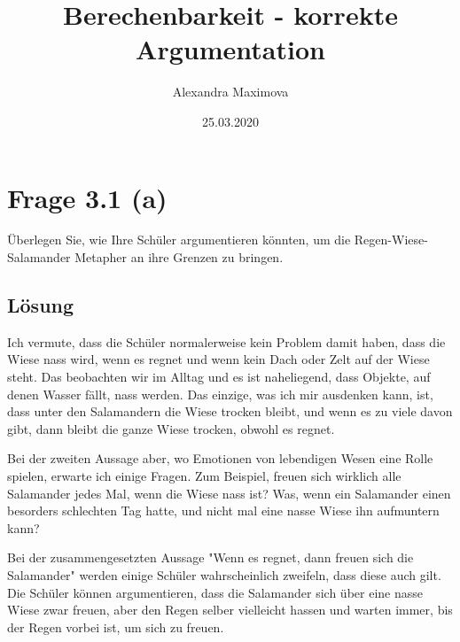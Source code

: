 \documentclass[
	12pt, %
	german, %
]{fphw}
\title{Berechenbarkeit - korrekte Argumentation} %
\author{Alexandra Maximova} %
\date{25.03.2020} %
\institute{ETH Zurich \\ Lehrdiplom Informatik} %
\begin{document}
\maketitle %


\section*{Frage 3.1 (a)}

\begin{problem}
	Überlegen Sie, wie Ihre Schüler argumentieren könnten, um die Regen-Wiese-Salamander Metapher an ihre Grenzen zu bringen.
\end{problem}


\subsection*{Lösung}
Ich vermute, dass die Schüler normalerweise kein Problem damit haben, dass die Wiese nass wird, wenn es regnet und wenn kein Dach oder Zelt auf der Wiese steht. Das beobachten wir im Alltag und es ist naheliegend, dass Objekte, auf denen Wasser fällt, nass werden. Das einzige, was ich mir ausdenken kann, ist, dass unter den Salamandern  die Wiese trocken bleibt, und wenn es zu viele davon gibt, dann bleibt die ganze Wiese trocken, obwohl es regnet.

Bei der zweiten Aussage aber, wo Emotionen von lebendigen Wesen eine Rolle spielen, erwarte ich einige Fragen. Zum Beispiel, freuen sich wirklich alle Salamander jedes Mal, wenn die Wiese nass ist? Was, wenn ein Salamander einen besorders schlechten Tag hatte, und nicht mal eine nasse Wiese ihn aufmuntern kann?

Bei der zusammengesetzten Aussage "Wenn es regnet, dann freuen sich die Salamander" werden einige Schüler wahrscheinlich zweifeln, dass diese auch gilt. Die Schüler können argumentieren, dass die Salamander sich über eine nasse Wiese zwar freuen, aber den Regen selber vielleicht hassen und warten immer, bis der Regen vorbei ist, um sich zu freuen.

\end{document}
